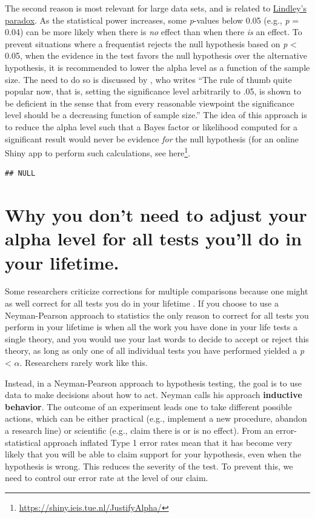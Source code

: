 \documentclass[
  oneside]{krantz}
\renewcommand{\href}[2]{#2\footnote{\url{#1}}}
\begin{document}
The second reason is most relevant for large data sets, and is related to \protect\hyperlink{lindley}{Lindley's paradox}. As the statistical power increases, some \emph{p}-values below 0.05 (e.g., \emph{p} = 0.04) can be more likely when there is \emph{no} effect than when there \emph{is} an effect. To prevent situations where a frequentist rejects the null hypothesis based on \emph{p} \textless{} 0.05, when the evidence in the test favors the null hypothesis over the alternative hypothesis, it is recommended to lower the alpha level as a function of the sample size. The need to do so is discussed by \citet{leamer_specification_1978}, who writes ``The rule of thumb quite popular now, that is, setting the significance level arbitrarily to .05, is shown to be deficient in the sense that from every reasonable viewpoint the significance level should be a decreasing function of sample size.'' The idea of this approach is to reduce the alpha level such that a Bayes factor or likelihood computed for a significant result would never be evidence \emph{for} the null hypothesis (for an online Shiny app to perform such calculations, see \href{https://shiny.ieis.tue.nl/JustifyAlpha/}{here}.

\begin{verbatim}
## NULL
\end{verbatim}

\hypertarget{why-you-dont-need-to-adjust-your-alpha-level-for-all-tests-youll-do-in-your-lifetime.}{%
\section{Why you don't need to adjust your alpha level for all tests you'll do in your lifetime.}\label{why-you-dont-need-to-adjust-your-alpha-level-for-all-tests-youll-do-in-your-lifetime.}}

Some researchers criticize corrections for multiple comparisons because one might as well correct for all tests you do in your lifetime \citep{perneger_whats_1998}. If you choose to use a Neyman-Pearson approach to statistics the only reason to correct for all tests you perform in your lifetime is when all the work you have done in your life tests a single theory, and you would use your last words to decide to accept or reject this theory, as long as only one of all individual tests you have performed yielded a \emph{p} \textless{} \(\alpha\). Researchers rarely work like this.

Instead, in a Neyman-Pearson approach to hypothesis testing, the goal is to use data to make decisions about how to act. Neyman \citeyearpar{neyman_inductive_1957} calls his approach \textbf{inductive behavior}. The outcome of an experiment leads one to take different possible actions, which can be either practical (e.g., implement a new procedure, abandon a research line) or scientific (e.g., claim there is or is no effect). From an error-statistical approach \citep{mayo_statistical_2018} inflated Type 1 error rates mean that it has become very likely that you will be able to claim support for your hypothesis, even when the hypothesis is wrong. This reduces the severity of the test. To prevent this, we need to control our error rate at the level of our claim.
\end{document}
